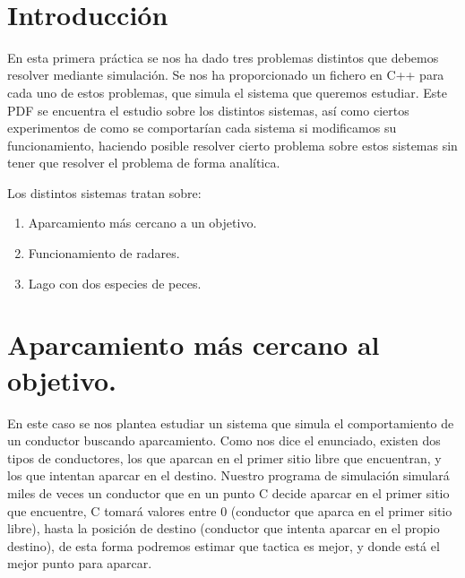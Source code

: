 \documentclass[12pt, spanish]{article}
\makeatletter
\let\thedate\@date
\makeatother
\begin{document}
\begin{titlepage}
    {\large \thedate}\\[0.5cm]
    {\doclicenseThis}

    \vfill

\end{titlepage}


\tableofcontents
\pagebreak



\section*{Introducción}

En esta primera práctica se nos ha dado tres problemas distintos que debemos resolver mediante simulación. Se nos ha proporcionado un fichero en C++ para cada uno de estos problemas, que simula el sistema que queremos estudiar. Este PDF se encuentra el estudio sobre los distintos sistemas, así como ciertos experimentos de como se comportarían cada sistema si modificamos su funcionamiento, haciendo posible resolver cierto problema sobre estos sistemas sin tener que resolver el problema de forma analítica.

Los distintos sistemas tratan sobre:

\begin{enumerate}
	\item Aparcamiento más cercano a un objetivo.
	\item Funcionamiento de radares.
	\item Lago con dos especies de peces.
\end{enumerate}


\section{Aparcamiento más cercano al objetivo.}

En este caso se nos plantea estudiar un sistema que simula el comportamiento de un conductor buscando aparcamiento. Como nos dice el enunciado, existen dos tipos de conductores, los que aparcan en el primer sitio libre que encuentran, y los que intentan aparcar en el destino. Nuestro programa de simulación simulará miles de veces un conductor que en un punto C decide aparcar en el primer sitio que encuentre, C tomará valores entre 0 (conductor que aparca en el primer sitio libre), hasta la posición de destino (conductor que intenta aparcar en el propio destino), de esta forma podremos estimar que tactica es mejor, y donde está el mejor punto para aparcar.
\end{document}
